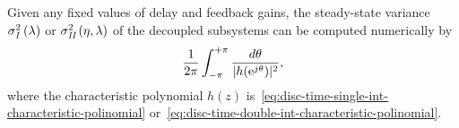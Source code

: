 
\subsection{}\label{app:disc-time-single-int-variance-explicit}

Given any fixed values of delay and feedback gains,
the steady-state variance $ \varx{\gpos}{I} $ or $ \varx{\gvel,\gpos}{II} $ of the decoupled subsystems can be computed numerically by
\begin{equation}\label{eq:disc-time-variance-integral}
	\dfrac{1}{2\pi}\int_{-\pi}^{+\pi}\dfrac{d\theta}{|h(\e^{j\theta})|^2},
\end{equation}
where the characteristic polynomial $ h(z) $
is~\eqref{eq:disc-time-single-int-characteristic-polinomial} or~\eqref{eq:disc-time-double-int-characteristic-polinomial}.

